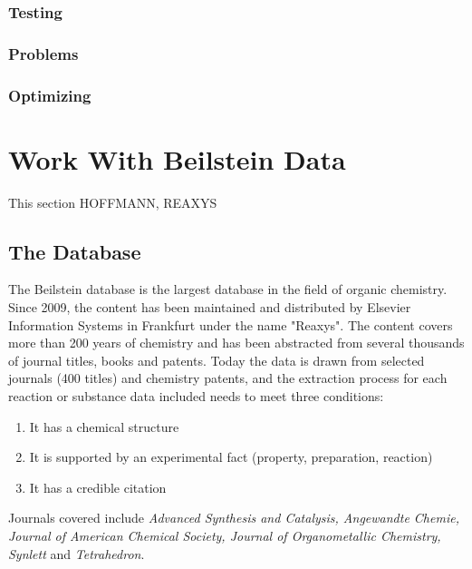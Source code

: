 \documentclass[a4paper,10pt,titlepage]{paper}
\begin{document}
\subsubsection{Testing}
\subsubsection{Problems}
\subsubsection{Optimizing}

\section{Work With Beilstein Data}
This section HOFFMANN, REAXYS
\subsection{The Database}
The Beilstein database is the largest database in the field of organic chemistry. Since 2009, the content has been maintained and distributed by Elsevier Information Systems in Frankfurt under the name "Reaxys".
The content covers more than 200 years of chemistry and has been abstracted from several thousands of journal titles, books and patents. Today the data is drawn from selected journals (400 titles) and chemistry patents, and the extraction process for each reaction or substance data included needs to meet three conditions:
\begin{enumerate}
\item
It has a chemical structure
\item
It is supported by an experimental fact (property, preparation, reaction)
\item
It has a credible citation
\end{enumerate}
Journals covered include \textit{Advanced Synthesis and Catalysis, Angewandte Chemie, Journal of American Chemical Society, Journal of Organometallic Chemistry, Synlett} and \textit{Tetrahedron}. \cite{WikiReaxys}\cite{WikiBeilstein}
\end{document}
